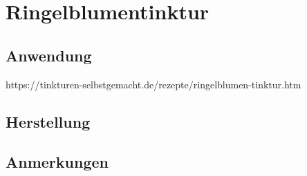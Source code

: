 \section{Ringelblumentinktur}

\subsection{Anwendung}

https://tinkturen-selbstgemacht.de/rezepte/ringelblumen-tinktur.htm

\subsection{Herstellung}

\subsection{Anmerkungen}





